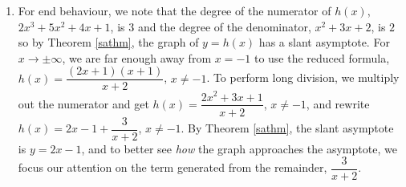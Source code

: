 {\begin{enumerate}
\begin{itemize}

\item  \textit{The behaviour of $y=h(x)$ as $x \rightarrow -2$:}  As $x \rightarrow -2^{-}$, we imagine substituting a number a little bit less than $-2$. We have $h(x) \approx \frac{(-3)(-1)}{(\mbox{\scriptsize very small $(-)$})} \approx \frac{3}{(\mbox{\scriptsize very small $(-)$})}\approx \mbox{very big $(-)$}$ thus as $x \rightarrow -2^{-}$, $h(x) \rightarrow -\infty$. On the other side of $-2$, as $x \rightarrow -2^{+}$, we find that $h(x) \approx \frac{3}{\mbox{\scriptsize very small $(+)$}} \approx \mbox{very big $(+)$}$, so $h(x) \rightarrow \infty$.


\item  \textit{The behaviour of $y=h(x)$ as $x \rightarrow -1$.}  As $x \rightarrow -1^{-}$, we imagine plugging in a number a bit less than $x=-1$. We have $h(x) \approx \frac{(-1)(\mbox{\scriptsize very small $(-)$})}{1} = \mbox{very small $(+)$}$ Hence, as $x \rightarrow -1^{-}$, $h(x) \rightarrow 0^{+}$. This means that as $x \rightarrow -1^{-}$, the graph is a bit above the point $(-1,0)$.  As $x \rightarrow -1^{+}$, we get $h(x) \approx \frac{(-1)(\mbox{\scriptsize very small $(+)$})}{1} = \mbox{very small $(-)$}$.  This gives us that as $x \rightarrow -1^{+}$, $h(x) \rightarrow 0^{-}$, so the graph is a little bit lower than $(-1,0)$ here. Our results are shown graphically in Figure \ref{fig:ratgraph8}. 

\end{itemize}



\item  For end behaviour, we note that the degree of the numerator of $h(x)$, $2x^3+5x^2+4x+1$, is $3$ and the degree of the denominator, $x^2+3x+2$, is $2$ so by Theorem \ref{sathm}, the graph of $y = h(x)$ has a slant asymptote.  For $x\rightarrow \pm \infty$, we are far enough away from $x=-1$ to use the reduced formula, $h(x) = \dfrac{(2x+1)(x+1)}{x+2}$, $x \neq -1$.  To perform long division, we multiply out the numerator and get $h(x) = \dfrac{2x^2+3x+1}{x+2}$, $x \neq -1$, and rewrite $h(x) = 2x-1+\dfrac{3}{x+2}$, $x \neq -1$.  By Theorem \ref{sathm}, the slant asymptote is $y = 2x-1$, and to better see \textit{how} the graph approaches the asymptote, we focus our attention on the term generated from the remainder, $\dfrac{3}{x+2}$.


\end{enumerate}}
